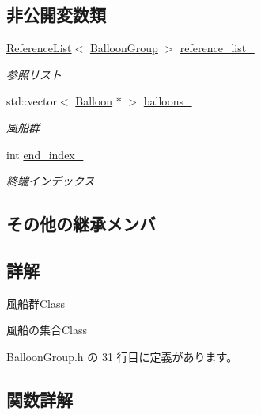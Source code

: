 \subsection*{非公開変数類}
\begin{DoxyCompactItemize}
\item 
\mbox{\hyperlink{class_reference_list}{Reference\+List}}$<$ \mbox{\hyperlink{class_balloon_group}{Balloon\+Group}} $>$ \mbox{\hyperlink{class_balloon_group_a5734f227201920a38dd0379fce5b2ee8}{reference\+\_\+list\+\_\+}}
\begin{DoxyCompactList}\small\item\em 参照リスト \end{DoxyCompactList}\item 
std\+::vector$<$ \mbox{\hyperlink{class_balloon}{Balloon}} $\ast$ $>$ \mbox{\hyperlink{class_balloon_group_a20dd8b50558bbbb0e8169bccea50261b}{balloons\+\_\+}}
\begin{DoxyCompactList}\small\item\em 風船群 \end{DoxyCompactList}\item 
int \mbox{\hyperlink{class_balloon_group_a7ec7d71eb6d9e333ccf3fc2017bfe9b2}{end\+\_\+index\+\_\+}}
\begin{DoxyCompactList}\small\item\em 終端インデックス \end{DoxyCompactList}\end{DoxyCompactItemize}
\subsection*{その他の継承メンバ}


\subsection{詳解}
風船群\+Class 

風船の集合\+Class 

 Balloon\+Group.\+h の 31 行目に定義があります。



\subsection{関数詳解}
\mbox{\label{class_balloon_group_ab2c00147bfd4c7776f2babc5d6568738}} 
